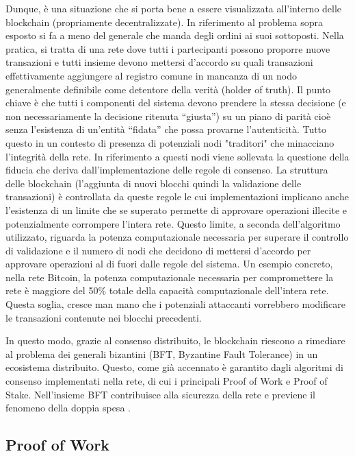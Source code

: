 Dunque, è una situazione che si porta bene a essere visualizzata all'interno delle blockchain (propriamente decentralizzate). In riferimento al problema sopra esposto si fa a meno del generale che manda degli ordini ai suoi sottoposti. Nella pratica, si tratta di una rete dove tutti i partecipanti possono proporre nuove transazioni e tutti insieme devono mettersi d'accordo su quali transazioni effettivamente aggiungere al registro comune in mancanza di un nodo generalmente definibile come detentore della verità (holder of truth). Il punto chiave è che tutti i componenti del sistema devono prendere la stessa decisione (e non necessariamente la decisione ritenuta “giusta”) su un piano di parità cioè senza l’esistenza di un’entità “fidata” che possa provarne l’autenticità. Tutto questo in un contesto di presenza di potenziali nodi "traditori" che minacciano l'integrità della rete. In riferimento a questi nodi viene sollevata la questione della fiducia che deriva dall'implementazione delle regole di consenso. La struttura delle blockchain (l’aggiunta di nuovi blocchi quindi la validazione delle transazioni) è controllata da queste regole le cui implementazioni implicano anche l'esistenza di un limite che se superato permette di approvare operazioni illecite e potenzialmente corrompere l'intera rete. Questo limite, a seconda dell’algoritmo utilizzato, riguarda la potenza computazionale necessaria per superare il controllo di validazione e il numero di nodi che decidono di mettersi d'accordo per approvare operazioni al di fuori dalle regole del sistema. Un esempio concreto, nella rete Bitcoin, la potenza computazionale necessaria per compromettere la rete è maggiore del 50\% totale della capacità computazionale dell’intera rete. Questa soglia, cresce man mano che i potenziali attaccanti vorrebbero modificare le transazioni contenute nei blocchi precedenti.

In questo modo, grazie al consenso distribuito, le blockchain riescono a rimediare al problema dei generali bizantini (BFT, Byzantine Fault Tolerance) in un ecosistema distribuito. Questo, come già accennato è garantito dagli algoritmi di consenso implementati nella rete, di cui i principali Proof of Work e Proof of Stake. Nell’insieme BFT contribuisce alla sicurezza della rete e previene il fenomeno della doppia spesa .


\subsection{Proof of Work}

